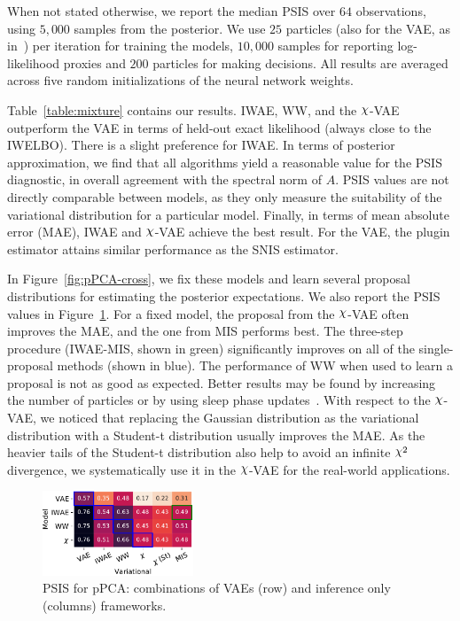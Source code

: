 When not stated otherwise, we report the median PSIS over $64$ observations, using $5,000$ samples from the posterior. %
We use $25$ particles (also for the VAE, as in~\cite{rainforth2018tighter}) per iteration for training the models, $10,000$ samples for reporting log-likelihood proxies and $200$ particles for making decisions. 
All results are averaged across five random initializations of the neural network weights. 

Table~\ref{table:mixture} contains our results. IWAE, WW, and the $\rchi$-VAE outperform the VAE in terms of held-out exact likelihood (always close to the IWELBO). There is a slight preference for IWAE.
In terms of posterior approximation, we find that all algorithms yield a reasonable value for the PSIS diagnostic, in overall agreement with the spectral norm of $A$. PSIS values are not directly comparable between models, as they only measure the suitability of the variational distribution for a particular model. 
Finally, in terms of mean absolute error (MAE), IWAE and $\rchi$-VAE achieve the best result. For the VAE, the plugin estimator attains similar performance as the SNIS estimator.

In Figure~\ref{fig:pPCA-cross}, we fix these models and learn several proposal distributions for estimating the posterior expectations. We also report the PSIS values in Figure~\ref{fig:PCAPSIS}. For a fixed model, the proposal from the  $\rchi$-VAE often improves the MAE, and the one from MIS performs best. The three-step procedure (IWAE-MIS, shown in green) significantly improves on all of the single-proposal methods (shown in blue). The performance of WW when used to learn a proposal is not as good as expected. Better results may be found by increasing the number of particles or by using sleep phase updates~\cite{le2018revisiting}. With respect to the $\rchi$-VAE, we noticed that replacing the Gaussian distribution as the variational distribution with a Student-t distribution usually improves the MAE. 
As the heavier tails of the Student-t distribution also help to avoid an infinite $\rchi^2$ divergence, we systematically use it in the $\rchi$-VAE for the real-world applications.

\begin{figure}
    \centering
    \includegraphics[width=0.4\textwidth]{figures/gaussian_other_cross.pdf}
    \caption[PSIS metric for pPCA]{
    PSIS for pPCA: combinations of VAEs (row) and inference only (columns) frameworks. 
    }
    \label{fig:PCAPSIS}
\end{figure}
